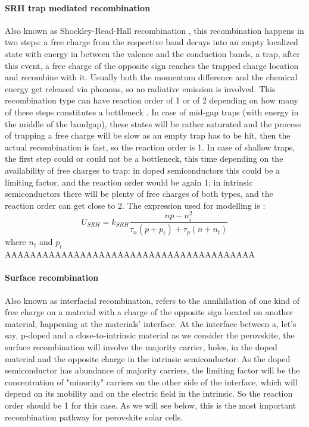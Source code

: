 \paragraph{SRH trap mediated recombination} Also known as Shockley-Read-Hall recombination \cite{Shockley1952}, this recombination happens in two steps: a free charge from the respective band decays into an empty localized state with energy in between the valence and the conduction bands, a trap, after this event, a free charge of the opposite sign reaches the trapped charge location and recombine with it. Usually both the momentum difference and the chemical energy get released via phonons, so no radiative emission is involved. This recombination type can have reaction order of 1 or of 2 depending on how many of these steps constitutes a bottleneck \cite{Calado2018b}. In case of mid-gap traps (with energy in the middle of the bandgap), these states will be rather saturated and the process of trapping a free charge will be slow as an empty trap has to be hit, then the actual recombination is fast, so the reaction order is 1. In case of shallow traps, the first step could or could not be a bottleneck, this time depending on the availability of free charges to trap: in doped semiconductors this could be a limiting factor, and the reaction order would be again 1; in intrinsic semiconductors there will be plenty of free charges of both types, and the reaction order can get close to 2. The expression used for modelling is \cite{Shockley1952}:
$$U_{SRH} = k_{SRH} \frac{np-n_i^2}{\tau_n(p+p_t)+ \tau_p(n+n_t)}$$
where $n_t$ and $p_t$ AAAAAAAAAAAAAAAAAAAAAAAAAAAAAAAAAAAAAAAA

\paragraph{Surface recombination} Also known as interfacial recombination, refers to the annihilation of one kind of free charge on a material with a charge of the opposite sign located on another material, happening at the materials' interface. At the interface between a, let's say, p-doped and a close-to-intrinsic material as we consider the perovskite, the surface recombination will involve the majority carrier, holes, in the doped material and the opposite charge in the intrinsic semiconductor. As the doped semiconductor has abundance of majority carriers, the limiting factor will be the concentration of "minority" carriers on the other side of the interface, which will depend on its mobility and on the electric field in the intrinsic. So the reaction order should be 1 for this case. As we will see below, this is the most important recombination pathway for perovskite solar cells.

